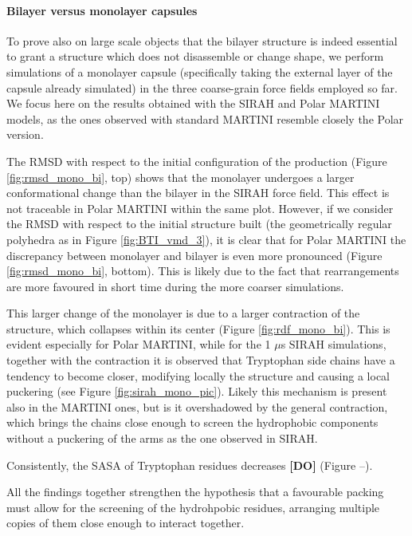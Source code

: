 \paragraph{Bilayer versus monolayer capsules}
To prove also on large scale objects that the bilayer structure is indeed essential to grant a structure which does not disassemble or change shape, we perform simulations of a monolayer capsule (specifically taking the external layer of the capsule already simulated) in the three coarse-grain force fields employed so far.
%
We focus here on the results obtained with the SIRAH and Polar MARTINI models, as the ones observed with standard MARTINI resemble closely the Polar version.

The RMSD with respect to the initial configuration of the production (Figure \ref{fig:rmsd_mono_bi}, top) shows that the monolayer undergoes a larger conformational change than the bilayer in the SIRAH force field. This effect is not traceable in Polar MARTINI within the same plot. However, if we consider the RMSD with respect to the initial structure built (the geometrically regular polyhedra as in Figure \ref{fig:BTI_vmd_3}), it is clear that for Polar MARTINI the discrepancy between monolayer and bilayer is even more pronounced (Figure \ref{fig:rmsd_mono_bi}, bottom). This is likely due to the fact that rearrangements are more favoured in short time during the more coarser simulations.

This larger change of the monolayer is due to a larger contraction of the structure, which collapses within its center (Figure \ref{fig:rdf_mono_bi}).
%
This is evident especially for Polar MARTINI, while for the 1 $\mu$s SIRAH simulations, together with the contraction it is observed that Tryptophan side chains have a tendency to become closer, modifying locally the structure and causing a local puckering (see Figure \ref{fig:sirah_mono_pic}). Likely this mechanism is present also in the MARTINI ones, but is it overshadowed by the general contraction, which brings the chains close enough to screen the hydrophobic components without a puckering of the arms as the one observed in SIRAH.

Consistently, the SASA of Tryptophan residues decreases \textbf{[DO]} (Figure --).

All the findings together strengthen the hypothesis that a favourable packing must allow for the screening of the hydrohpobic residues, arranging multiple copies of them close enough to interact together.

